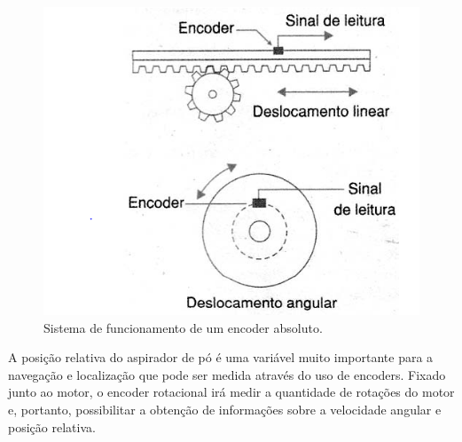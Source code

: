 \begin{enumerate}
					\begin{figure}[H]
						\centering
						\includegraphics[scale=0.6]{figuras/encoder.png}
						\caption{Sistema de funcionamento de um encoder absoluto.}
						\label{img:encoder}
					\end{figure}

					A posição relativa do aspirador de pó é uma variável muito importante para a navegação e localização que pode ser medida através do uso de encoders. Fixado junto ao motor, o encoder rotacional irá medir a quantidade de rotações do motor e, portanto, possibilitar a obtenção de informações sobre a velocidade angular e posição relativa. 

			\end{enumerate}



